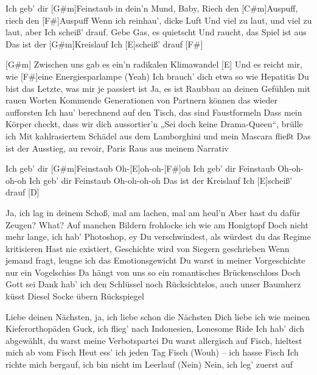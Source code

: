 

\begin{guitar}
	Ich geb' dir [G#m]Feinstaub in dein'n Mund, Baby, 
	Riech den [C#m]Auspuff, riech den [F#]Auspuff
	Wenn ich reinhau', dicke Luft 
	Und viel zu laut, und viel zu laut, aber 
	Ich scheiß' drauf. Gebe Gas, es quietscht
	Und raucht, das Spiel ist aus
	Das ist der [G#m]Kreislauf
	Ich [E]scheiß' drauf [F#]{}
	
	[G#m] Zwischen uns gab es ein'n radikalen Klimawandel
	[E] Und es reicht mir, wie [F#]eine Energiesparlampe (Yeah)
	Ich brauch' dich etwa so wie Hepatitis
	Du bist das Letzte, was mir je passiert ist
	Ja, es ist Raubbau an deinen Gefühlen mit rauen Worten
	Kommende Generationen von Partnern können das wieder aufforsten
	Ich hau' berechnend auf den Tisch, das sind Faustformeln
	Dass mein Körper checkt, dass wir dich aussortier'n
	„Sei doch keine Drama-Queen“, brülle ich 
	Mit kahlrasiertem Schädel aus dem Lamborghini und mein Mascara fließt
	Das ist der Ausstieg, au revoir, Paris
	Raus aus meinem Narrativ
	
	 

	Ich geb' dir [G#m]Feinstaub
	Oh-[E]oh-oh-[F#]oh
	Ich geb' dir Feinstaub
	Oh-oh-oh-oh
	Ich geb' dir Feinstaub
	Oh-oh-oh-oh
	Das ist der Kreislauf
	Ich [E]scheiß' drauf [D]{}
	
	Ja, ich lag in deinem Schoß, mal am lachen, mal am heul'n
	Aber hast du dafür Zeugen?
	What? Auf manchen Bildern frohlocke ich wie am Honigtopf
	Doch nicht mehr lange, ich hab' Photoshop, ey
	Du verschwindest, als würdest du das Regime kritisieren
	Hast nie existiert, Geschichte wird von Siegern geschrieben
	Wenn jemand fragt, leugne ich das Emotionsgewicht
	Du warst in meiner Vorgeschichte nur ein Vogelschiss
	Da hängt von uns so ein romantisches Brückenschloss
	Doch Gott sei Dank hab' ich den Schlüssel noch
	Rücksichtslos, auch unser Baumherz küsst Diesel
	Socke übern Rückspiegel
	
	 
	
	 
	
	Liebe deinen Nächsten, ja, ich liebe schon die Nächsten
	Dich liebe ich wie meinen Kieferorthopäden
	Guck, ich flieg' nach Indonesien, Lonesome Ride
	Ich hab' dich abgewählt, du warst meine Verbotspartei
	Du warst allergisch auf Fisch, hieltest mich ab vom Fisch
	Heut ess' ich jeden Tag Fisch (Wouh) – ich hasse Fisch
	Ich richte mich bergauf, ich bin nicht im Leerlauf (Nein)
	Nein, ich leg' zuerst auf
	

\end{guitar}
